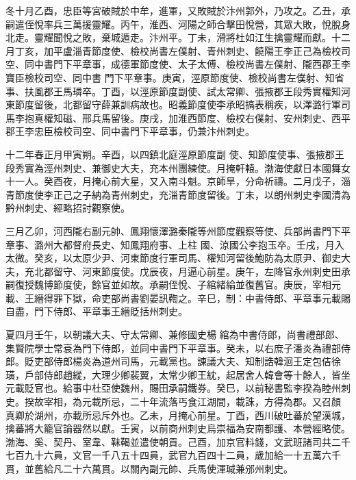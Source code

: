 \begin{pinyinscope}
 冬十月乙酉，忠臣等宮破賊於中牟，進軍，又敗賊於汴州郭外，乃攻之。乙丑，承嗣遣侄悅率兵三萬援靈耀。丙午，淮西、河陽之師合擊田悅營，其眾大敗，悅脫身北走。靈耀聞悅之敗，棄城遁走。汴州平。丁未，滑將杜如江生擒靈耀而獻。十二月丁亥，加平盧淄青節度使、檢校尚書左僕射、青州刺史、饒陽王李正己為檢校司空、同中書門下平章事，成德軍節度使、太子太傅、檢校尚書左僕射、隴西郡王李寶臣檢校司空、同中書
 門下平章事。庚寅，涇原節度使、檢校尚書左僕射、知省事、扶風郡王馬璘卒。丁酉，以涇原節度副使、試太常卿、張掖郡王段秀實權知河東節度留後，北都留守薛兼訓病故也。昭義節度使李承昭搞表稱疾，以澤潞行軍司馬李抱真權知磁、邢兵馬留後。庚戌，加淮西節度、檢校右僕射、安州刺史、西平郡王李忠臣檢校司空、同中書門下平章事，仍兼汴州刺史。



 十二年春正月甲寅朔。辛酉，以四鎮北庭涇原節度副
 使、知節度使事、張掖郡王段秀實為涇州刺史、兼御史大夫，充本州團練使。月掩軒轅。渤海使獻日本國舞女十一人。癸酉夜，月掩心前大星，又入南斗魁。京師旱，分命祈禱。二月戊子，淄青節度使李正己之子納為青州刺史，充淄青節度留後。丁未，以朗州刺史李國清為黔州刺史、經略招討觀察使。



 三月乙卯，河西隴右副元帥、鳳翔懷澤潞秦隴等州節度觀察等使、兵部尚書門下平章事、潞州大都督府長史、知鳳翔府事、上柱
 國、涼國公李抱玉卒。壬戌，月入太微。癸亥，以太原少尹、河東節度行軍司馬、權知河留後鮑防為太原尹、御史大夫，充北都留守、河東節度使。戊辰夜，月逼心前星。庚午，左降官永州刺史田承嗣復授魏博節度使，餘官並如故。承嗣侄悅、子綰緒綸並復舊官。庚辰，宰相元載、王縉得罪下獄，命吏部尚書劉晏訊鞫之。辛巳，制：中書侍郎、平章事元載賜自盡，門下侍郎、平章事王縉貶括州刺史。



 夏四月壬午，以朝議大夫、守太常卿、兼修國史楊
 綰為中書侍郎，尚書禮部郎、集賢院學士常袞為門下侍郎，並同中書門下平章事。癸未，以右庶子潘炎為禮部侍郎。貶吏部侍郎楊炎為道州司馬，元載黨也。諫議大夫、知制誥韓洄王定包佶徐璜，戶部侍郎趙縱，大理少卿裴翼，太常少卿王紞，起居舍人韓會等十餘人，皆坐元載貶官也。給事中杜亞使魏州，賜田承嗣鐵券。癸巳，以前秘書監李揆為睦州刺史。揆故宰相，為元載所忌，二十年流落丐食江湖間，載誅，方得為郡。又召顏
 真卿於湖州，亦載所忌斥外也。乙未，月掩心前星。丁酉，西川破吐蕃於望漢城，擒蕃將大籠官論器然以獻。壬寅，以前商州刺史烏崇福為安南都護、本營經略使。渤海、奚、契丹、室韋、靺鞨並遣使朝貢。己酉，加京官料錢，文武班諸司共二千七百九十六員，文官一千八五十四員，武官九百四十二員，歲加給一十五萬六千貫，並舊給凡二十六萬貫。以關內副元帥、兵馬使渾瑊兼邠州刺史。




\end{pinyinscope}
